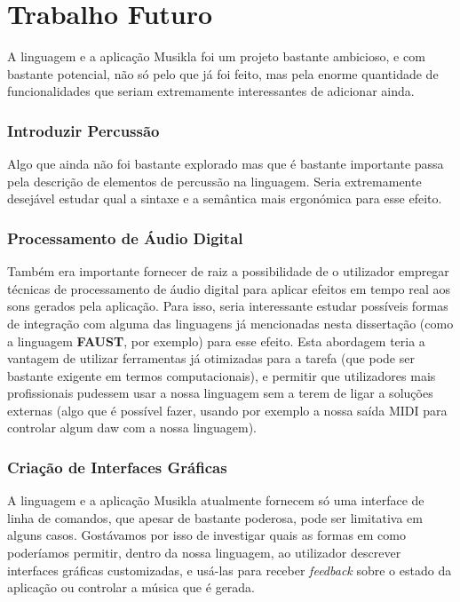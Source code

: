 \section{Trabalho Futuro}
A linguagem e a aplicação Musikla foi um projeto bastante ambicioso, e com bastante potencial, não só pelo que já foi feito, mas pela enorme quantidade de funcionalidades que seriam extremamente interessantes de adicionar ainda.

\subsubsection*{Introduzir Percussão}
Algo que ainda não foi bastante explorado mas que é bastante importante passa pela descrição de elementos de percussão na linguagem. Seria extremamente desejável estudar qual a sintaxe e a semântica mais ergonómica para esse efeito.

\subsubsection*{Processamento de Áudio Digital}
Também era importante fornecer de raiz a possibilidade de o utilizador empregar técnicas de processamento de áudio digital para aplicar efeitos em tempo real aos sons gerados pela aplicação. Para isso, seria interessante estudar possíveis formas de integração com alguma das linguagens já mencionadas nesta dissertação (como a linguagem \textbf{FAUST}, por exemplo) para esse efeito. Esta abordagem teria a vantagem de utilizar ferramentas já otimizadas para a tarefa (que pode ser bastante exigente em termos computacionais), e permitir que utilizadores mais profissionais pudessem usar a nossa linguagem sem a terem de ligar a soluções externas (algo que é possível fazer, usando por exemplo a nossa saída MIDI para controlar algum \acrfull{daw} com a nossa linguagem).

\subsubsection*{Criação de Interfaces Gráficas}
A linguagem e a aplicação Musikla atualmente fornecem só uma interface de linha de comandos, que apesar de bastante poderosa, pode ser limitativa em alguns casos. Gostávamos por isso de investigar quais as formas em como poderíamos permitir, dentro da nossa linguagem, ao utilizador descrever interfaces gráficas customizadas, e usá-las para receber \textit{feedback} sobre o estado da aplicação ou controlar a música que é gerada.

